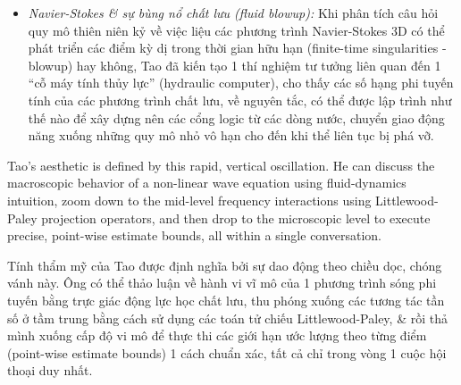 \documentclass[11pt]{article}
\begin{document}
\begin{itemize}
\item \emph{Navier-Stokes \& sự bùng nổ chất lưu (fluid blowup):} Khi phân tích câu hỏi quy mô thiên niên kỷ về việc liệu các phương trình Navier-Stokes 3D có thể phát triển các điểm kỳ dị trong thời gian hữu hạn (finite-time singularities - blowup) hay không, Tao đã kiến tạo 1 thí nghiệm tư tưởng liên quan đến 1 ``cỗ máy tính thủy lực'' (hydraulic computer), cho thấy các số hạng phi tuyến tính của các phương trình chất lưu, về nguyên tắc, có thể được lập trình như thế nào để xây dựng nên các cổng logic từ các dòng nước, chuyển giao động năng xuống những quy mô nhỏ vô hạn cho đến khi thể liên tục bị phá vỡ.
\end{itemize}

\begin{center}
\end{center}

Tao's aesthetic is defined by this rapid, vertical oscillation. He can discuss the macroscopic behavior of a non-linear wave equation using fluid-dynamics intuition, zoom down to the mid-level frequency interactions using Littlewood-Paley projection operators, and then drop to the microscopic level to execute precise, point-wise estimate bounds, all within a single conversation.

Tính thẩm mỹ của Tao được định nghĩa bởi sự dao động theo chiều dọc, chóng vánh này. Ông có thể thảo luận về hành vi vĩ mô của 1 phương trình sóng phi tuyến bằng trực giác động lực học chất lưu, thu phóng xuống các tương tác tần số ở tầm trung bằng cách sử dụng các toán tử chiếu Littlewood-Paley, \& rồi thả mình xuống cấp độ vi mô để thực thi các giới hạn ước lượng theo từng điểm (point-wise estimate bounds) 1 cách chuẩn xác, tất cả chỉ trong vòng 1 cuộc hội thoại duy nhất.
\end{document}
